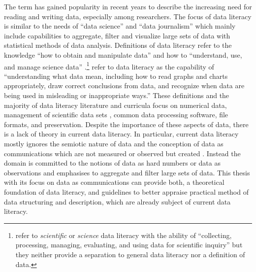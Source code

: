 The term  has gained popularity in recent years to describe
the increasing need for reading and writing data, especially among researchers.
The focus of data literacy is similar to the needs of ``data science'' and
``data journalism'' \cite{Bradshaw2011} which mainly include capabilities to
aggregate, filter and visualize large sets of data with statistical methods of
data analysis. Definitions of data literacy refer to the knowledge ``how to
obtain and manipulate data'' \cite{Schield2004} and how to ``understand, use,
and manage science data'' \cite{Qin2010}.\footnote{\textcite{Qin2010} refer to
\emph{scientific} or \emph{science} data literacy with the ability of
``collecting, processing, managing, evaluating, and using data for scientific
inquiry'' but they neither provide a separation to general data literacy nor a
definition of data.} \textcite{Carlson2011} refer to data literacy as the
capability of ``understanding what data mean, including how to read graphs and
charts appropriately, draw correct conclusions from data, and recognize when
data are being used in misleading or inappropriate ways.'' These definitions
and the majority of data literacy literature and curricula focus on numerical
data, management of scientific data sets \cite{Haendel2012}, common data
processing software, file formats, and preservation. Despite the importance of
these aspects of data, there is a lack of theory in current data literacy. In
particular, current data literacy mostly ignores the semiotic nature of data
and the conception of data as communications which are not measured or observed
but created \cite{BallsunStanton2012}. Instead the domain is committed to the
notions of data as hard numbers or data as observations and emphasises
 to aggregate and filter large sets of data. This
thesis with its focus on data as communications can provide both, a theoretical
foundation of data literacy, and guidelines to better appraise practical method
of data structuring and description, which are already subject of current data
literacy.

